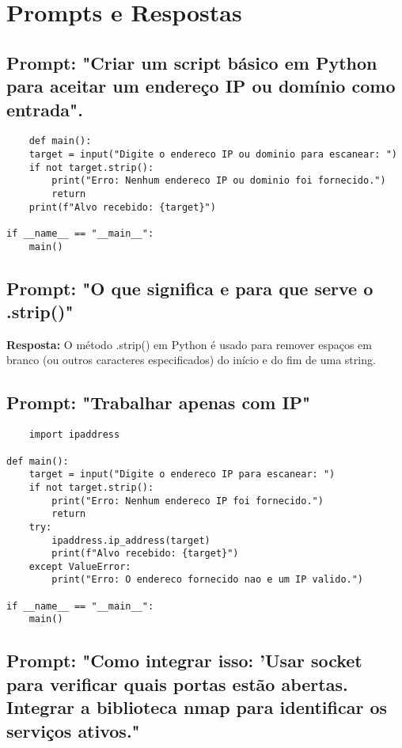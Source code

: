 \documentclass[12pt]{article}
\begin{document}
\section{Prompts e Respostas}

\subsection{\textbf{Prompt:}  "Criar um script básico em Python para aceitar um endereço IP ou domínio como entrada". }
    \begin{lstlisting}
    def main():
    target = input("Digite o endereco IP ou dominio para escanear: ")
    if not target.strip():
        print("Erro: Nenhum endereco IP ou dominio foi fornecido.")
        return
    print(f"Alvo recebido: {target}")

if __name__ == "__main__":
    main()
    \end{lstlisting}
\subsection{\textbf{Prompt:} "O que significa e para que serve o .strip()"}
    \textbf{Resposta:} O método .strip() em Python é usado para remover espaços em branco (ou outros caracteres especificados) do início e do fim de uma string.

\subsection{\textbf{Prompt:} "Trabalhar apenas com IP"}
    \begin{lstlisting}
    import ipaddress

def main():
    target = input("Digite o endereco IP para escanear: ")
    if not target.strip():
        print("Erro: Nenhum endereco IP foi fornecido.")
        return
    try:
        ipaddress.ip_address(target)
        print(f"Alvo recebido: {target}")
    except ValueError:
        print("Erro: O endereco fornecido nao e um IP valido.")

if __name__ == "__main__":
    main()
    \end{lstlisting}
\subsection{\textbf{Prompt:} "Como integrar isso: 'Usar socket para verificar quais portas estão abertas. Integrar a biblioteca nmap para identificar os serviços ativos."}
\end{document}
